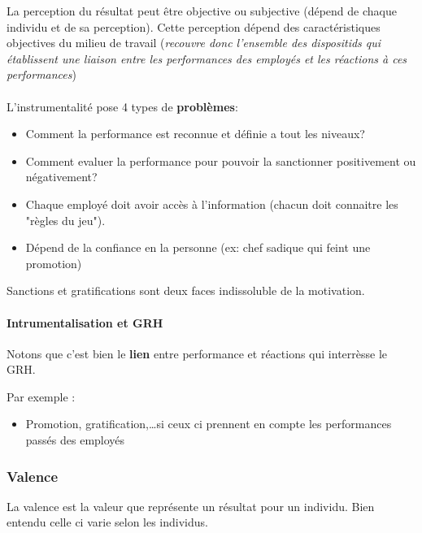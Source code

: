 \documentclass[11pt]{article} %
\begin{document}
La perception du résultat peut être objective ou subjective (dépend
de chaque individu et de sa perception). Cette perception dépend des
caractéristiques objectives du milieu de travail (\textit{recouvre
donc l'ensemble des dispositids qui établissent une liaison entre les
performances des employés et les réactions à ces performances})

\paragraph{ }L'instrumentalité pose 4 types de \textbf{problèmes}:
 \begin{itemize}
	\item Comment la performance est reconnue et définie a tout les
        niveaux? 
	\item Comment evaluer la performance pour pouvoir la sanctionner
        positivement ou négativement?
	\item Chaque employé doit avoir accès à l'information (chacun doit
        connaitre les "règles du jeu"). 
	\item Dépend de la confiance en la personne (ex: chef sadique qui
        feint une promotion)
 \end{itemize}

Sanctions et gratifications sont deux faces indissoluble de la
motivation.

\paragraph{Intrumentalisation et GRH}
Notons que c'est bien le \textbf{lien} entre performance et réactions
qui interrèsse le GRH.

Par exemple :
\begin{itemize}
    \item Promotion, gratification,\ldots si ceux ci prennent en compte
        les performances passés des employés
\end{itemize}
 
\subsubsection{Valence} 
La valence est la valeur que représente un résultat pour un individu.
Bien entendu celle ci varie selon les individus.
\end{document}
